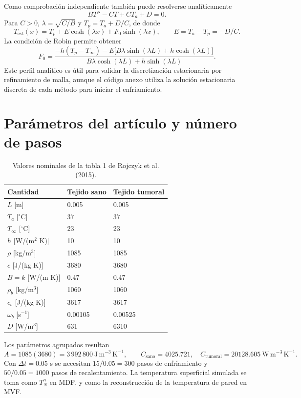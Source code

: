 \documentclass[11pt,a4paper]{article}
\begin{document}
Como comprobación independiente también puede resolverse analíticamente
\begin{equation}
BT''-CT+CT_a+D=0.
\end{equation}
Para $C>0$, $\lambda=\sqrt{C/B}$ y $T_p=T_a+D/C$, de donde
\begin{equation}
T_{\mathrm{est}}(x)=T_p+E\cosh(\lambda x)+F_0\sinh(\lambda x),\qquad E=T_a-T_p=-D/C.
\end{equation}
La condición de Robin permite obtener
\begin{equation}
F_0=\frac{-h(T_p-T_\infty)-E\bigl[B\lambda\sinh(\lambda L)+h\cosh(\lambda L)\bigr]}{B\lambda\cosh(\lambda L)+h\sinh(\lambda L)}.
\end{equation}
Este perfil analítico es útil para validar la discretización estacionaria por refinamiento de malla, aunque el código anexo utiliza la solución estacionaria discreta de cada método para iniciar el enfriamiento.

\section{Parámetros del artículo y número de pasos}
\begin{table}[H]\centering\small
\begin{tabular}{lll}\toprule
Cantidad & Tejido sano & Tejido tumoral\\\midrule
$L$ [m] & 0.005 & 0.005\\
$T_a$ [$^\circ$C] & 37 & 37\\
$T_\infty$ [$^\circ$C] & 23 & 23\\
$h$ [W/(m$^2$ K)] & 10 & 10\\
$\rho$ [kg/m$^3$] & 1085 & 1085\\
$c$ [J/(kg K)] & 3680 & 3680\\
$B=k$ [W/(m K)] & 0.47 & 0.47\\
$\rho_b$ [kg/m$^3$] & 1060 & 1060\\
$c_b$ [J/(kg K)] & 3617 & 3617\\
$\omega_b$ [s$^{-1}$] & 0.00105 & 0.00525\\
$D$ [W/m$^3$] & 631 & 6310\\\bottomrule
\end{tabular}
\caption{Valores nominales de la tabla 1 de Rojczyk et al. (2015).}
\end{table}
Los parámetros agrupados resultan
\begin{equation}
A=1085(3680)=3\,992\,800\ \mathrm{J\,m^{-3}\,K^{-1}},\qquad
C_{\mathrm{sano}}=4025.721,\quad C_{\mathrm{tumoral}}=20128.605\ \mathrm{W\,m^{-3}\,K^{-1}}.
\end{equation}
Con $\Delta t=0.05$ s se necesitan $15/0.05=300$ pasos de enfriamiento y $50/0.05=1000$ pasos de recalentamiento. La temperatura superficial simulada se toma como $T_N^n$ en MDF, y como la reconstrucción de la temperatura de pared en MVF.
\end{document}
